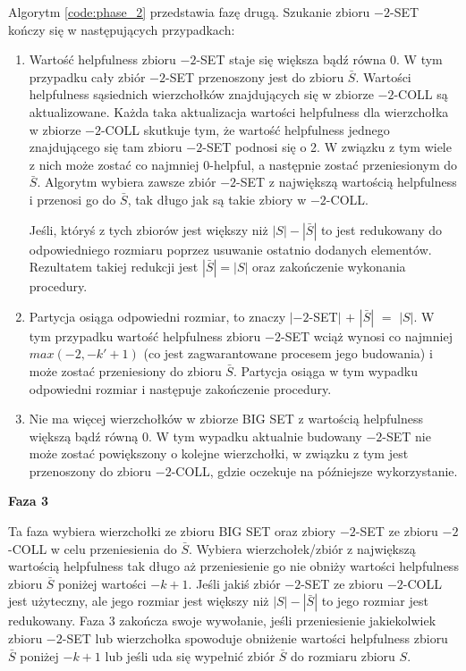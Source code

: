 Algorytm \ref{code:phase_2} przedstawia fazę drugą.
Szukanie zbioru $-2$-SET kończy się w następujących przypadkach:
\begin{enumerate}
    \item {Wartość helpfulness zbioru $-2$-SET staje się większa bądź równa 0. W tym przypadku cały zbiór $-2$-SET
    przenoszony jest do zbioru $\bar{S}$. Wartości helpfulness sąsiednich wierzchołków znajdujących się w zbiorze
    $-2$-COLL są aktualizowane. Każda taka aktualizacja wartości helpfulness dla wierzchołka w zbiorze $-2$-COLL
    skutkuje tym, że wartość helpfulness jednego znajdującego się tam zbioru $-2$-SET podnosi się o 2. W związku z tym
    wiele z nich może zostać co najmniej $0$-helpful, a następnie zostać przeniesionym do $\bar{S}$.
    Algorytm wybiera zawsze zbiór $-2$-SET z największą wartością helpfulness i przenosi go do $\bar{S}$, tak długo
    jak są takie zbiory w $-2$-COLL.

    Jeśli, któryś z tych zbiorów jest większy niż $|S| - |\bar{S}|$ to jest redukowany do odpowiedniego rozmiaru poprzez
    usuwanie ostatnio dodanych elementów. Rezultatem takiej redukcji jest $|\bar{S}| = |S|$ oraz zakończenie
    wykonania procedury.}
    \item {Partycja osiąga odpowiedni rozmiar, to znaczy $|-2$-SET$|$ $+$ $|\bar{S}|$ $=$ $|S|$. W tym przypadku wartość
    helpfulness zbioru $-2$-SET wciąż wynosi co najmniej $max(-2, -k' + 1)$ (co jest zagwarantowane procesem jego budowania)
    i może zostać przeniesiony do zbioru $\bar{S}$. Partycja osiąga w tym wypadku odpowiedni rozmiar i następuje
    zakończenie procedury.}
    \item {Nie ma więcej wierzchołków w zbiorze BIG SET z wartością helpfulness większą bądź równą $0$. W tym wypadku
    aktualnie budowany $-2$-SET nie może zostać powiększony o kolejne wierzchołki, w związku z tym jest przenoszony do
    zbioru $-2$-COLL, gdzie oczekuje na późniejsze wykorzystanie.}
\end{enumerate}

\vspace{8mm}
\textbf{Faza 3}

Ta faza wybiera wierzchołki ze zbioru BIG SET oraz zbiory $-2$-SET ze zbioru $-2$-COLL w celu przeniesienia do
$\bar{S}$.
Wybiera wierzchołek/zbiór z największą wartością helpfulness tak długo aż przeniesienie go nie obniży wartości
helpfulness zbioru $\bar{S}$ poniżej wartości $-k+1$.
Jeśli jakiś zbiór $-2$-SET ze zbioru $-2$-COLL jest użyteczny, ale jego rozmiar jest większy niż $|S| - |\bar{S}|$
to jego rozmiar jest redukowany.
Faza 3 zakończa swoje wywołanie, jeśli przeniesienie jakiekolwiek zbioru $-2$-SET lub wierzchołka spowoduje
obniżenie wartości helpfulness zbioru $\bar{S}$ poniżej $-k+1$ lub jeśli uda się wypełnić zbiór $\bar{S}$ do
rozmiaru zbioru $S$.
